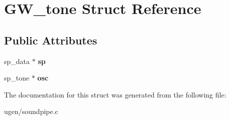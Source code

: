 \hypertarget{structGW__tone}{}\section{G\+W\+\_\+tone Struct Reference}
\label{structGW__tone}
\subsection*{Public Attributes}
\begin{DoxyCompactItemize}
\item 
\hypertarget{structGW__tone_a96437e34bf9e0f35ebcebacb08e03115}{}\label{structGW__tone_a96437e34bf9e0f35ebcebacb08e03115} 
sp\+\_\+data $\ast$ {\bfseries sp}
\item 
\hypertarget{structGW__tone_a71697b6759fb4e1ecabddb59cca0fcd2}{}\label{structGW__tone_a71697b6759fb4e1ecabddb59cca0fcd2} 
sp\+\_\+tone $\ast$ {\bfseries osc}
\end{DoxyCompactItemize}


The documentation for this struct was generated from the following file\+:\begin{DoxyCompactItemize}
\item 
ugen/soundpipe.\+c\end{DoxyCompactItemize}
